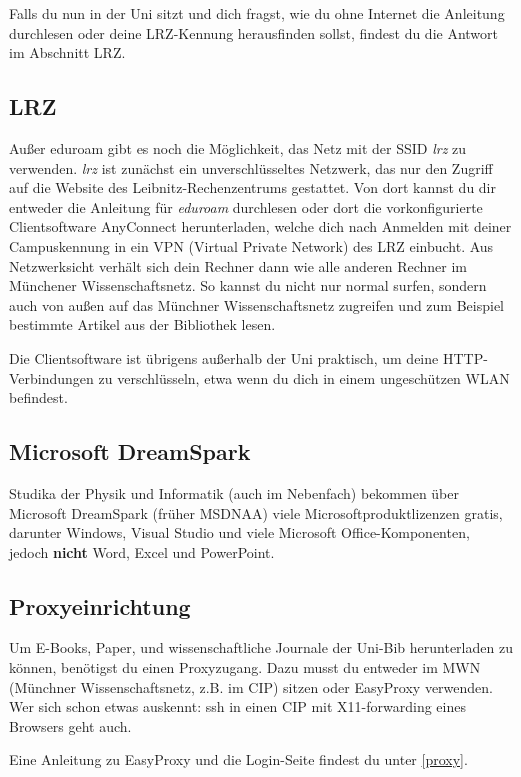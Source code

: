
Falls du nun in der Uni sitzt und dich fragst, wie du ohne Internet
die Anleitung durchlesen oder deine LRZ-Kennung herausfinden sollst, 
findest du die Antwort im Abschnitt LRZ.

\begin{urlList}
\end{urlList}

\subsection*{LRZ}
Außer eduroam gibt es noch die Möglichkeit, das Netz mit der SSID
\emph{lrz} zu verwenden. \emph{lrz} ist zunächst ein unverschlüsseltes
Netzwerk, das nur den Zugriff auf die Website des
Leibnitz-Rechenzentrums gestattet. Von dort kannst du dir entweder die 
Anleitung für \emph{eduroam} durchlesen oder dort die
vorkonfigurierte Clientsoftware AnyConnect herunterladen, welche dich
nach Anmelden mit deiner Campuskennung in ein VPN (Virtual Private
Network) des LRZ einbucht. Aus Netzwerksicht verhält sich dein Rechner
dann wie alle anderen Rechner im Münchener Wissenschaftsnetz. So
kannst du nicht nur normal surfen, sondern auch von außen auf das
Münchner Wissenschaftsnetz zugreifen und zum Beispiel bestimmte
Artikel aus der Bibliothek lesen.

Die Clientsoftware ist übrigens außerhalb der Uni praktisch, um deine
HTTP-Verbindungen zu verschlüsseln, etwa wenn du dich in einem
ungeschützen WLAN befindest.

\subsection*{Microsoft DreamSpark \subjectList{\subjectI{}\subjectMI{}\subjectP{}}}
Studika der Physik und Informatik (auch im Nebenfach) bekommen über
Microsoft DreamSpark (früher MSDNAA) viele Microsoftproduktlizenzen
gratis, darunter Windows, Visual Studio und viele
Microsoft Office-Komponenten, jedoch \textbf{nicht} Word, Excel und PowerPoint.

\begin{urlList}
\end{urlList}

\subsection*{Proxyeinrichtung} Um E-Books, Paper, und wissenschaftliche
Journale der Uni-Bib herunterladen zu können, benötigst du einen Proxyzugang.
Dazu musst du entweder im MWN (Münchner Wissenschaftsnetz, z.B. im CIP) sitzen
oder EasyProxy verwenden. Wer sich schon etwas auskennt: ssh in einen CIP mit X11-forwarding
eines Browsers geht auch.

Eine Anleitung zu EasyProxy und die Login-Seite findest du unter \ref{proxy}.

\begin{urlList}
\end{urlList}
